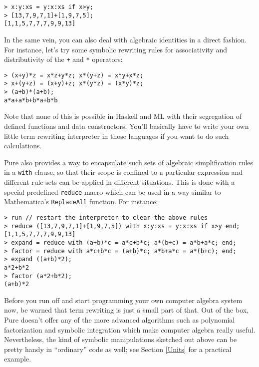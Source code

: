 \documentclass[a4paper,12pt]{article}
\begin{document}
\begin{lstlisting}
> x:y:xs = y:x:xs if x>y;
> [13,7,9,7,1]+[1,9,7,5];
[1,1,5,7,7,7,9,9,13]
\end{lstlisting}

In the same vein, you can also deal with algebraic identities in a direct fashion. For instance, let's try some symbolic rewriting rules for associativity and distributivity of the \verb|+| and \verb|*| operators:

\begin{lstlisting}
> (x+y)*z = x*z+y*z; x*(y+z) = x*y+x*z;
> x+(y+z) = (x+y)+z; x*(y*z) = (x*y)*z;
> (a+b)*(a+b);
a*a+a*b+b*a+b*b
\end{lstlisting}

Note that none of this is possible in Haskell and ML with their segregation of defined functions and data constructors. You'll basically have to write your own little term rewriting interpreter in those languages if you want to do such calculations.

Pure also provides a way to encapsulate such sets of algebraic simplification rules in a \lstinline{with} clause, so that their scope is confined to a particular expression and different rule sets can be applied in different situations. This is done with a special predefined \verb|reduce| macro which can be used in a way similar to Mathematica's \verb|ReplaceAll| function. For instance:

\begin{lstlisting}
> run // restart the interpreter to clear the above rules
> reduce ([13,7,9,7,1]+[1,9,7,5]) with x:y:xs = y:x:xs if x>y end;
[1,1,5,7,7,7,9,9,13]
> expand = reduce with (a+b)*c = a*c+b*c; a*(b+c) = a*b+a*c; end;
> factor = reduce with a*c+b*c = (a+b)*c; a*b+a*c = a*(b+c); end;
> expand ((a+b)*2);
a*2+b*2
> factor (a*2+b*2);
(a+b)*2
\end{lstlisting}

Before you run off and start programming your own computer algebra system now, be warned that term rewriting is just a small part of that. Out of the box, Pure doesn't offer any of the more advanced algorithms such as polynomial factorization and symbolic integration which make computer algebra really useful. Nevertheless, the kind of symbolic manipulations sketched out above can be pretty handy in ``ordinary'' code as well; see Section \ref{Units} for a practical example.
\end{document}
